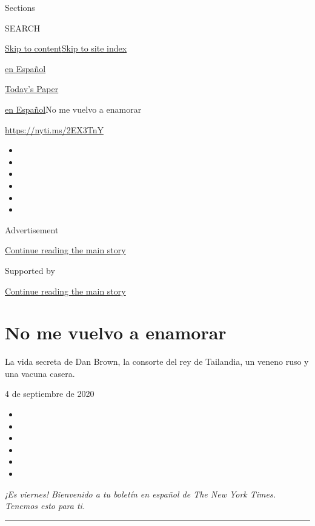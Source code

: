 Sections

SEARCH

\protect\hyperlink{site-content}{Skip to
content}\protect\hyperlink{site-index}{Skip to site index}

\href{https://www.nytimes3xbfgragh.onion/es/}{en Español}

\href{https://myaccount.nytimes3xbfgragh.onion/auth/login?response_type=cookie\&client_id=vi}{}

\href{https://www.nytimes3xbfgragh.onion/section/todayspaper}{Today's
Paper}

\href{/es/}{en Español}\textbar{}No me vuelvo a enamorar

\url{https://nyti.ms/2EX3TnY}

\begin{itemize}
\item
\item
\item
\item
\item
\item
\end{itemize}

Advertisement

\protect\hyperlink{after-top}{Continue reading the main story}

Supported by

\protect\hyperlink{after-sponsor}{Continue reading the main story}

\hypertarget{no-me-vuelvo-a-enamorar}{%
\section{No me vuelvo a enamorar}\label{no-me-vuelvo-a-enamorar}}

La vida secreta de Dan Brown, la consorte del rey de Tailandia, un
veneno ruso y una vacuna casera.

4 de septiembre de 2020

\begin{itemize}
\item
\item
\item
\item
\item
\item
\end{itemize}

\emph{¡Es viernes! Bienvenido a tu boletín en español de The New York
Times. Tenemos esto para ti.}

\begin{center}\rule{0.5\linewidth}{\linethickness}\end{center}

